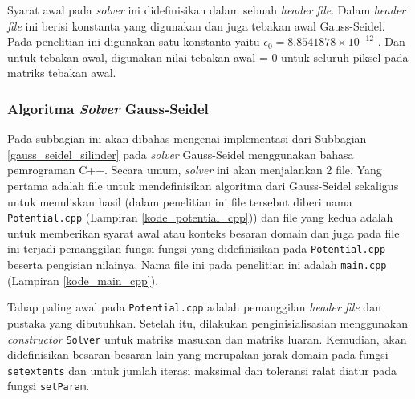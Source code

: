 Syarat awal pada \textit{solver} ini didefinisikan dalam sebuah \textit{header
file}. Dalam \textit{header file} ini berisi konstanta yang digunakan dan juga tebakan
awal Gauss-Seidel. Pada penelitian ini digunakan satu konstanta yaitu
$\epsilon_{0} = 8.8541878 \times 10^{-12}$ \citep{lubos_brieda_2019}. Dan untuk
tebakan awal, digunakan nilai tebakan awal = 0 untuk seluruh piksel pada matriks
tebakan awal.

\subsubsection{Algoritma \textit{Solver} Gauss-Seidel}

Pada subbagian ini akan dibahas mengenai implementasi dari Subbagian
\ref{gauss_seidel_silinder} pada \textit{solver} Gauss-Seidel menggunakan bahasa
pemrograman C++. Secara umum, \textit{solver} ini akan menjalankan 2 file. Yang pertama
adalah file untuk mendefinisikan algoritma dari Gauss-Seidel sekaligus untuk menuliskan
hasil (dalam penelitian ini file tersebut diberi nama \texttt{Potential.cpp} (Lampiran
\ref{kode_potential_cpp})) dan file yang kedua adalah untuk memberikan syarat
awal atau konteks besaran domain dan juga pada file ini terjadi pemanggilan
fungsi-fungsi yang didefinisikan pada \texttt{Potential.cpp} beserta pengisian nilainya.
Nama file ini pada penelitian ini adalah \texttt{main.cpp} (Lampiran
\ref{kode_main_cpp}).

Tahap paling awal pada \texttt{Potential.cpp} adalah pemanggilan \textit{header
file} dan pustaka yang dibutuhkan. Setelah itu, dilakukan penginisialisasian menggunakan
\textit{constructor} \texttt{Solver} untuk matriks masukan dan matriks luaran.
Kemudian, akan didefinisikan besaran-besaran lain yang merupakan jarak domain pada
fungsi \texttt{setextents} dan untuk jumlah iterasi maksimal dan toleransi ralat
diatur pada fungsi \texttt{setParam}.

